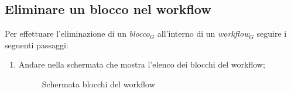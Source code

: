 \subsection{Eliminare un blocco nel workflow}
Per effettuare l'eliminazione di un \textit{blocco$_{G}$} all'interno di un \textit{workflow$_{G}$} seguire i seguenti passaggi:
\begin{enumerate}
	\item Andare nella schermata che mostra l'elenco dei blocchi del workflow;
	\begin{figure}[!ht]
		\centering
		\caption{Schermata blocchi del workflow}
	\end{figure}

\end{enumerate}
